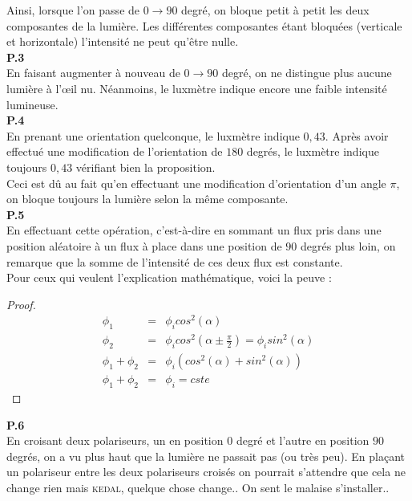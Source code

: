 \documentclass	[11pt, a4paper, openany]{book}
\begin{document}
Ainsi, lorsque l'on passe de $0 \rightarrow 90$ degré, on bloque petit à petit les deux composantes de la lumière. Les différentes composantes étant bloquées (verticale et horizontale) l'intensité ne peut qu'être nulle.\\

\textbf{P.3}\\
En faisant augmenter à nouveau de $0 \rightarrow 90$ degré, on ne distingue plus aucune lumière à l'œil nu. Néanmoins, le luxmètre indique encore une faible intensité lumineuse.\\

\textbf{P.4}\\
En prenant une orientation quelconque, le luxmètre indique $0,43$. Après avoir effectué une modification de l'orientation de $180$ degrés, le luxmètre indique toujours $0,43$ vérifiant bien la proposition.\\
Ceci est dû au fait qu'en effectuant une modification d'orientation d'un angle $\pi$, on bloque toujours la lumière selon la même composante.\\

\textbf{P.5}\\
En effectuant cette opération, c'est-à-dire en sommant un flux pris dans une position aléatoire à un flux à place dans une position de $90$ degrés plus loin, on remarque que la somme de l'intensité de ces deux flux est constante.\\
Pour ceux qui veulent l'explication mathématique, voici la peuve : \\
\begin{proof}
\begin{eqnarray}
\phi_1 &=& \phi_icos^2(\alpha)\\
\phi_2 &=& \phi_icos^2(\alpha \pm \frac{\pi}{2}) = \phi_isin^2(\alpha)\\
\phi_1 + \phi_2 &=& \phi_i(cos^2(\alpha) + sin^2(\alpha))\\
\phi_1 + \phi_2 &=& \phi_i = cste
\end{eqnarray}
\end{proof}

\textbf{P.6}\\
En croisant deux polariseurs, un en position $0$ degré et l'autre en position $90$ degrés, on a vu plus haut que la lumière ne passait pas (ou très peu). En plaçant un polariseur entre les deux polariseurs croisés on pourrait s'attendre que cela ne change rien mais \textsc{kedal}, quelque chose change.. On sent le malaise s'installer..\\
\end{document}
